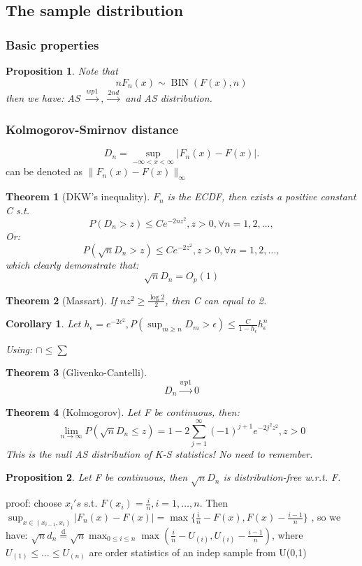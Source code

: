 \documentclass{ctexart}
\newtheorem{theorem}{Theorem}[subsection]
\newtheorem{corollary}{Corollary}[subsection]
\newtheorem{proposition}{Proposition}[subsection]
\begin{document}
\subsection{The sample distribution}
\subsubsection{Basic properties}
\begin{proposition}
  Note that 
  \[
  nF_{n}(x)\sim \operatorname{BIN}(F(x),n)
  \] 
  then we have: AS \(\xrightarrow{wp1},\xrightarrow{2nd}\) and AS distribution.
\end{proposition}
\subsubsection{Kolmogorov-Smirnov distance}
\[
D_{n}=\sup_{-\infty<x<\infty}|F_{n}(x)-F(x)|.
\]  
can be denoted as \(\|F_{n}(x)-F(x)\|_{\infty}\)
\begin{theorem}[DKW's inequality]
  \(F_{n}\) is the ECDF, then exists a positive constant C s.t. 
  \[
  P(D_{n}>z)\le Ce^{-2nz^{2}},z>0,\forall n=1,2,\ldots,
  \]  
  Or: 
  \[
  P(\sqrt{n}D_{n}>z)\le Ce^{-2z^{2}},z>0,\forall n=1,2,\ldots,
  \] 
  which clearly demonstrate that: 
  \[
  \sqrt{n}D_{n}=O_{p}(1)
  \]  
\end{theorem} 
\begin{theorem}[Massart]
  If \(nz^{2}\ge \frac{\log 2}{2}\), then C can equal to 2.  
\end{theorem}
\begin{corollary}
  Let \(h_{\epsilon}=e^{-2\epsilon^{2}},P(\sup _{m\ge n}D_{m}>\epsilon)\le \frac{C}{1-h_{\epsilon}}h_{\epsilon}^{n}\)
  
  Using: \(\cap \le \sum\) 
\end{corollary}
\begin{theorem}[Glivenko-Cantelli]
  \[
  D_{n}\xrightarrow{wp1}0
  \] 
\end{theorem}
\begin{theorem}[Kolmogorov]
  Let F be continuous, then: 
  \[
  \lim_{n\to \infty}P(\sqrt{n}D_{n}\le z)=1-2 \sum_{j=1}^{\infty} (-1)^{j+1} e^{-2j^{2}z^{2}},z>0
  \] 
  This is the null AS distribution of K-S statistics! No need to remember.
\end{theorem}
\begin{proposition}
  Let F be continuous, then \(\sqrt{n}D_{n}\) is distribution-free w.r.t. F. 
\end{proposition}
proof: choose \(x_{i}'s\) s.t. \(F(x_{i})=\frac{i}{n},i=1,\ldots,n\). Then \(\sup_{x\in (x_{i-1},x_{i})}|F_{n}(x)-F(x)|=\max\{\frac{i}{n}-F(x),F(x)-\frac{i-1}{n}\}\)  
, so we have: \(\sqrt{n}d_{n}\overset{\text{d}}{=}\sqrt{n}\max_{0\le i\le n}\max (\frac{i}{n}-U_{(i)},U_{(i)}-\frac{i-1}{n})\), where \(U_{(1)}\le \ldots\le U_{(n)}\) are order statistics of an indep sample from U(0,1)
\end{document}
